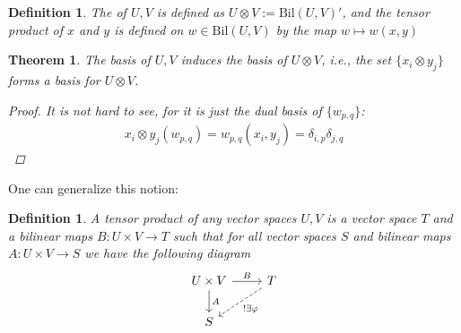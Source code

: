 \documentclass[10pt,twoside,openany,final]{memoir}
\theoremstyle{break}
\newtheorem{theorem}[section]{Theorem}
\newtheorem{definition}[section]{Definition}
\theoremstyle{Break}
\newcommand{\Bil}{\mathrm{Bil}}
\let\emph\relax
\begin{document}
\begin{definition}
	The \emph{tensor product} of $U,V$ is defined as $U \otimes V := \Bil(U,V)'$, and the tensor product of $x$ and $y$ is defined on $w \in \Bil(U,V)$ by the map $w \mapsto w(x,y)$
\end{definition}

\begin{theorem}
	The basis of $U,V$ induces the basis of $U \otimes V$, i.e., the set $\{ x_i \otimes y_j\}$ forms a basis for $U \otimes V$.
	\begin{proof}
		It is not hard to see, for it is just the dual basis of $\{w_{p,q}\}$:
		\begin{align*}
			x_{i}\otimes y_j (w_{p,q})=w_{p,q}(x_i,y_j)=\delta_{i,p}\delta_{j,q}
		\end{align*}
	\end{proof}
\end{theorem}

One can generalize this notion:

\begin{definition}
	A tensor product of any vector spaces $U,V$ is a vector space $T$ and a bilinear maps $B \colon U \times V \to T$ such that for all vector spaces $S$ and bilinear maps $A \colon U \times V \to S$ we have the following diagram
	\[
\begin{tikzcd}
	U \times V \ar[r,"B"] \ar[d,"A"] & T \ar[ld,dashed,"!\exists \varphi"]\\
	 S &
\end{tikzcd}
	\]
\end{definition}
\end{document}
